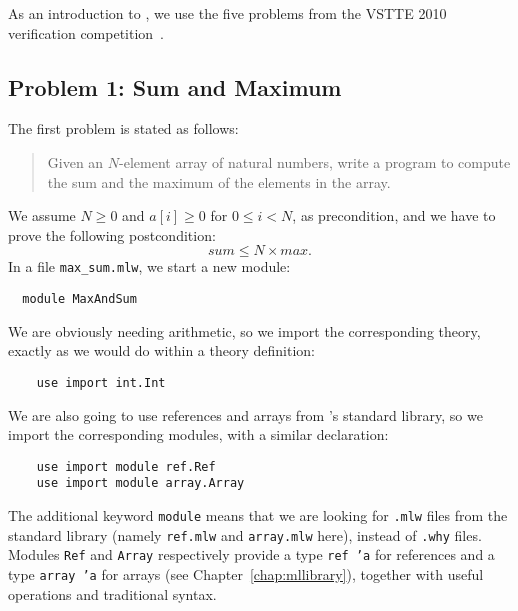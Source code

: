 \medskip
As an introduction to \whyml, we use the five problems from the VSTTE
2010 verification competition~\cite{vstte10comp}.

\subsection{Problem 1: Sum and Maximum}

The first problem is stated as follows:
\begin{quote}
  Given an $N$-element array of natural numbers,
  write a program to compute the sum and the maximum of the
  elements in the array.
\end{quote}
We  assume $N \ge 0$ and $a[i] \ge 0$ for $0 \le i < N$, as precondition,
and we have to prove the following postcondition:
\begin{displaymath}
  sum \le N \times max.
\end{displaymath}
In a file \verb|max_sum.mlw|, we start a new module:
\begin{verbatim}
  module MaxAndSum
\end{verbatim}
We are obviously needing arithmetic, so we import the corresponding
theory, exactly as we would do within a theory definition:
\begin{verbatim}
    use import int.Int
\end{verbatim}
We are also going to use references and arrays from \whyml's standard
library, so we import the corresponding modules, with a similar
declaration:
\begin{verbatim}
    use import module ref.Ref
    use import module array.Array
\end{verbatim}
The additional keyword \texttt{module} means that we are looking for
\texttt{.mlw} files from the standard library (namely \texttt{ref.mlw}
and \texttt{array.mlw} here), instead of \texttt{.why} files.
Modules \texttt{Ref} and \texttt{Array} respectively provide a type
\texttt{ref 'a} for references and a type \texttt{array 'a} for
arrays (see Chapter~\ref{chap:mllibrary}), together with useful
operations and traditional syntax.

